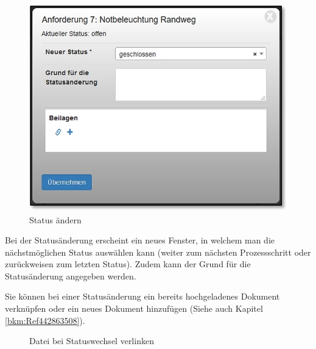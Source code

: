 \begin{figure}   %
  \vspace{-15pt}      %
  \begin{center}
    \includegraphics[width=1\linewidth]{../chapters/06_Anf-Maengelmanagement/pictures/amm_AnfStatusAendern.jpg}
  \end{center}
  \vspace{-20pt}
  \caption{Status ändern}
  \vspace{-10pt}
\end{figure}
Bei der Statusänderung erscheint ein neues Fenster, in welchem man die nächstmöglichen Status auswählen kann (weiter zum nächsten Prozessschritt oder zurückweisen zum letzten Status). Zudem kann der Grund für die Statusänderung angegeben werden.

\vspace{.3cm} 

Sie können bei einer Statusänderung ein bereits hochgeladenes Dokument verknüpfen oder ein neues Dokument hinzufügen (Siehe auch Kapitel \ref{bkm:Ref442863508}).

\begin{figure}[H]
\caption{Datei bei Statuswechsel verlinken}
\end{figure}

